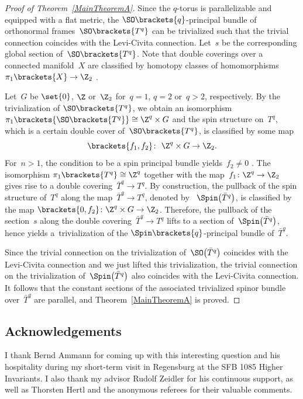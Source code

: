 \documentclass[pdftex]{sigma}
\numberwithin{equation}{section}
\begin{document}
\begin{proof}[Proof of Theorem~\ref{MainTheoremA}]
Since the $q$-torus is parallelizable and equipped with a flat metric, the $\SO\brackets{q}$-principal bundle of orthonormal frames~$\SO\brackets{T^q}$ can be trivialized such that the trivial connection coincides with the Levi-Civita connection. Let~$s$ be the corresponding global section of~$\SO\brackets{T^q}$. Note that double coverings over a connected manifold~$X$ are classified by homotopy classes of homomorphisms~${\pi_1\brackets{X}\to \Z_2}$ \cite[Section 1.3]{Hatcher2001}.

Let~$G$ be $\set{0}$, $\Z$ or~$\Z_2$ for~$q=1$, $q=2$ or~$q>2$, respectively. By the trivialization of $\SO\brackets{T^q}$, we obtain an isomorphism $\pi_1\brackets{\SO\brackets{T^q}}\cong \Z^q\times G$ and the spin structure on~$T^q$, which is a certain double cover of~$\SO\brackets{T^q}$, is classified by some map
\[
 \brackets{f_1,f_2}\colon\ \Z^q\times G \to \Z_2.
\]
For~$n>1$, the condition to be a spin principal bundle yields~$f_2\neq 0$ \cite[Section~1, Corollary 1.5]{Lawson1989}.
The isomorphism $\pi_1\brackets{T^q}\cong \Z^q$ together with the map~$f_1\colon \Z^q \to \Z_2$ gives rise to a double covering~$\bar{T}^q \to T^q$. By construction, the pullback of the spin structure of~$T^q$ along the map~${\bar{T}^q\to T^q}$, denoted by ~$\Spin\bigl(\bar{T}^q\bigr)$, is classified by the map $\brackets{0,f_2}\colon \Z^q\times G \to \Z_2$. Therefore, the pullback of the section~$s$ along the double covering~$\bar{T}^q\to T^q$ lifts to a section of~$\Spin\bigl(\bar{T}^q\bigr)$, hence yields a~trivialization of the $\Spin\brackets{q}$-principal bundle of~$\bar{T}^q$.

Since the trivial connection on the trivialization of~$\SO\bigl(\bar{T}^q\bigr)$ coincides with the Levi-Civita connection and we just lifted this trivialization, the trivial connection on the trivialization of~$\Spin\bigl(\bar{T}^q\bigr)$ also coincides with the Levi-Civita connection. It follows that the constant sections of the associated trivialized spinor bundle over~$\bar{T}^q$ are parallel, and Theorem~\ref{MainTheoremA} is proved.
\end{proof}

\subsection*{Acknowledgements}

I thank Bernd Ammann for coming up with this interesting question and his hospitality during my short-term visit in Regensburg at the SFB 1085 Higher Invariants. I also thank my advisor Rudolf Zeidler for his continuous support, as well as Thorsten Hertl and the anonymous referees for their valuable comments.
\end{document}
